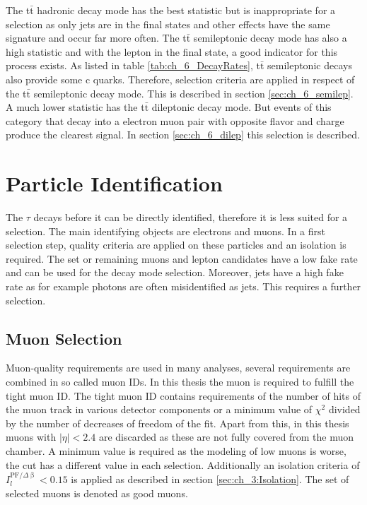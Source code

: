 The t$\bar{\textrm{t}}$ hadronic decay mode has the best statistic but is inappropriate for a selection as only jets are in the final states and other effects have the same signature and occur far more often. The t$\bar{\textrm{t}}$ semileptonic decay mode has also a high statistic and with the lepton in the final state, a good indicator for this process exists. As listed in table \ref{tab:ch_6_DecayRates}, t$\bar{\textrm{t}}$ semileptonic decays also provide some c quarks. Therefore, selection criteria are applied in respect of the t$\bar{\textrm{t}}$ semileptonic decay mode. This is described in section \ref{sec:ch_6_semilep}. A much lower statistic has the t$\bar{\textrm{t}}$ dileptonic decay mode. But events of this category that decay into a electron muon pair with opposite flavor and charge produce the clearest signal. In section \ref{sec:ch_6_dilep} this selection is described.

\section{Particle Identification}
The $\tau$ decays before it can be directly identified, therefore it is less suited for a selection. The main identifying objects are electrons and muons. In a first selection step, quality criteria are applied on these particles and an isolation is required. The set or remaining muons and lepton candidates have a low fake rate and can be used for the decay mode selection. 
Moreover, jets have a high fake rate as for example photons are often misidentified as jets. This requires a further selection. 

\subsection{Muon Selection}
Muon-quality requirements are used in many analyses, several requirements are combined in so called muon IDs. In this thesis the muon is required to fulfill the tight muon ID. The tight muon ID contains requirements of the number of hits of the muon track in various detector components or a minimum value of $\chi^2$ divided by the number of decreases of freedom of the fit. Apart from this, in this thesis muons with $|\eta| < 2.4$ are discarded as these are not fully covered from the muon chamber. A minimum \pt value is required as the modeling of low \pt muons is worse, the \pt cut has a different value in each selection.  Additionally an isolation criteria of $I_l^{\textrm{PF}/\Delta \upbeta} < 0.15$ is applied as described in section \ref{sec:ch_3:Isolation}. The set of selected muons is denoted as good muons.

